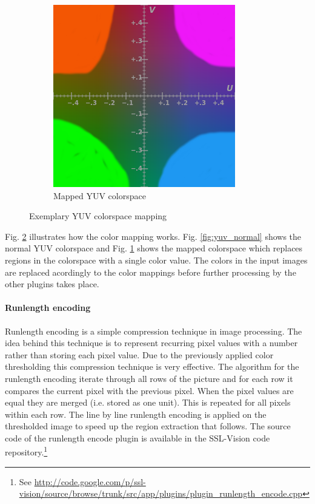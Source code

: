 \begin{savenotes}
\begin{figure}
\begin{subfigure}[b]{0.3\textwidth}
                \centering
                \includegraphics[width=\textwidth]{img/YUV_LUT.png}
                \caption{Mapped YUV colorspace}
                \label{fig:yuv_mapped}
        \end{subfigure}

        \caption{Exemplary YUV colorspace mapping}\label{fig:yuv}
\end{figure}
\end{savenotes}

Fig. \ref{fig:yuv} illustrates how the color mapping works. Fig.
\ref{fig:yuv_normal} shows the normal YUV colorspace and Fig.
\ref{fig:yuv_mapped} shows the mapped colorspace which replaces regions in the
colorspace with a single color value. The colors in the input images are
replaced acordingly to the color mappings before further processing by the other
plugins takes place.


\paragraph{Runlength encoding}

Runlength encoding is a simple compression technique in image processing. The
idea behind this technique is to represent recurring pixel values with a number
rather than storing each pixel value. Due to the previously applied color thresholding
this compression technique is very effective.
The algorithm for the runlength encoding iterate through all rows of the picture
and for each row it compares the current pixel with the previous pixel. When the pixel values are
equal they are merged (i.e. stored as one unit). This is repeated for all pixels within each row.
The line by line runlength encoding is applied on the thresholded image to speed up the
region extraction that follows.
The source code of the runlength encode plugin is available in the SSL-Vision code 
repository.\footnote{See \url{http://code.google.com/p/ssl-vision/source/browse/trunk/src/app/plugins/plugin_runlength_encode.cpp}}

